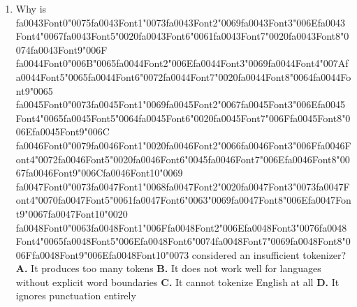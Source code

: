 \documentclass[11pt]{article}
\begin{document}
\begin{enumerate}[leftmargin=*]
  \item Why is {\csname fa0043Font0\endcsname\char"0075}{\csname fa0043Font1\endcsname\char"0073}{\csname fa0043Font2\endcsname\char"0069}{\csname fa0043Font3\endcsname\char"006E}{\csname fa0043Font4\endcsname\char"0067}{\csname fa0043Font5\endcsname\char"0020}{\csname fa0043Font6\endcsname\char"0061}{\csname fa0043Font7\endcsname\char"0020}{\csname fa0043Font8\endcsname\char"0074}{\csname fa0043Font9\endcsname\char"006F} {\csname fa0044Font0\endcsname\char"006B}{\char"0065}{\csname fa0044Font2\endcsname\char"006E}{\csname fa0044Font3\endcsname\char"0069}{\csname fa0044Font4\endcsname\char"007A}{\csname fa0044Font5\endcsname\char"0065}{\csname fa0044Font6\endcsname\char"0072}{\csname fa0044Font7\endcsname\char"0020}{\csname fa0044Font8\endcsname\char"0064}{\csname fa0044Font9\endcsname\char"0065} {\csname fa0045Font0\endcsname\char"0073}{\csname fa0045Font1\endcsname\char"0069}{\csname fa0045Font2\endcsname\char"0067}{\csname fa0045Font3\endcsname\char"006E}{\csname fa0045Font4\endcsname\char"0065}{\csname fa0045Font5\endcsname\char"0064}{\csname fa0045Font6\endcsname\char"0020}{\csname fa0045Font7\endcsname\char"006F}{\csname fa0045Font8\endcsname\char"006E}{\csname fa0045Font9\endcsname\char"006C} {\csname fa0046Font0\endcsname\char"0079}{\csname fa0046Font1\endcsname\char"0020}{\csname fa0046Font2\endcsname\char"0066}{\csname fa0046Font3\endcsname\char"006F}{\csname fa0046Font4\endcsname\char"0072}{\csname fa0046Font5\endcsname\char"0020}{\csname fa0046Font6\endcsname\char"0045}{\csname fa0046Font7\endcsname\char"006E}{\csname fa0046Font8\endcsname\char"0067}{\csname fa0046Font9\endcsname\char"006C}{\csname fa0046Font10\endcsname\char"0069} {\csname fa0047Font0\endcsname\char"0073}{\csname fa0047Font1\endcsname\char"0068}{\csname fa0047Font2\endcsname\char"0020}{\csname fa0047Font3\endcsname\char"0073}{\csname fa0047Font4\endcsname\char"0070}{\csname fa0047Font5\endcsname\char"0061}{\csname fa0047Font6\endcsname\char"0063}{\char"0069}{\csname fa0047Font8\endcsname\char"006E}{\csname fa0047Font9\endcsname\char"0067}{\csname fa0047Font10\endcsname\char"0020} {\csname fa0048Font0\endcsname\char"0063}{\csname fa0048Font1\endcsname\char"006F}{\csname fa0048Font2\endcsname\char"006E}{\csname fa0048Font3\endcsname\char"0076}{\csname fa0048Font4\endcsname\char"0065}{\csname fa0048Font5\endcsname\char"006E}{\csname fa0048Font6\endcsname\char"0074}{\csname fa0048Font7\endcsname\char"0069}{\csname fa0048Font8\endcsname\char"006F}{\csname fa0048Font9\endcsname\char"006E}{\csname fa0048Font10\endcsname\char"0073} considered an insufficient tokenizer?
    \textbf{A.} It produces too many tokens
    \textbf{B.} It does not work well for languages without explicit word boundaries
    \textbf{C.} It cannot tokenize English at all
    \textbf{D.} It ignores punctuation entirely


\end{enumerate}
\end{document}

